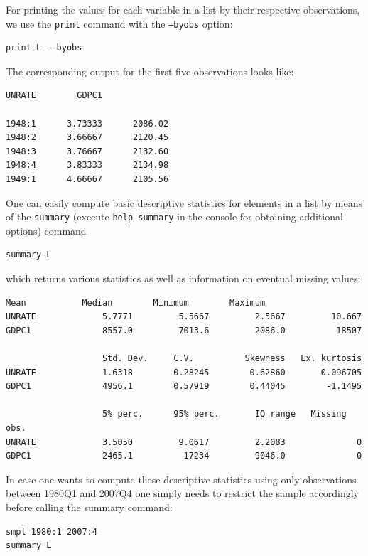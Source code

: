 \documentclass[11pt]{article}
\begin{document}
For printing the values for each variable in a list by their respective observations, we use the \texttt{print} command with the \texttt{---byobs} option:
\begin{Verbatim}[baselinestretch=0.75, fontsize=\small]
print L --byobs
\end{Verbatim}
The corresponding output for the first five observations looks like:
\begin{Verbatim}[baselinestretch=0.75, fontsize=\small]
             UNRATE        GDPC1

1948:1      3.73333      2086.02
1948:2      3.66667      2120.45
1948:3      3.76667      2132.60
1948:4      3.83333      2134.98
1949:1      4.66667      2105.56
\end{Verbatim}

One can easily compute basic descriptive statistics for elements in a list by means of the \texttt{summary} (execute \texttt{help summary} in the console for obtaining additional options) command
\begin{Verbatim}[baselinestretch=0.75, fontsize=\small]
summary L
\end{Verbatim}
which returns various statistics as well as information on eventual missing values:
\begin{Verbatim}[baselinestretch=0.75, fontsize=\small]
                   Mean           Median        Minimum        Maximum
UNRATE             5.7771         5.5667         2.5667         10.667
GDPC1              8557.0         7013.6         2086.0          18507

                   Std. Dev.     C.V.          Skewness   Ex. kurtosis
UNRATE             1.6318        0.28245        0.62860       0.096705
GDPC1              4956.1        0.57919        0.44045        -1.1495

                   5% perc.      95% perc.       IQ range   Missing obs.
UNRATE             3.5050         9.0617         2.2083              0
GDPC1              2465.1          17234         9046.0              0
\end{Verbatim}

In case one wants to compute these descriptive statistics using only observations between 1980Q1 and 2007Q4 one simply needs to restrict the sample accordingly before calling the summary command:
\begin{Verbatim}[baselinestretch=0.75, fontsize=\small]
smpl 1980:1 2007:4
summary L
\end{Verbatim}
\end{document}
